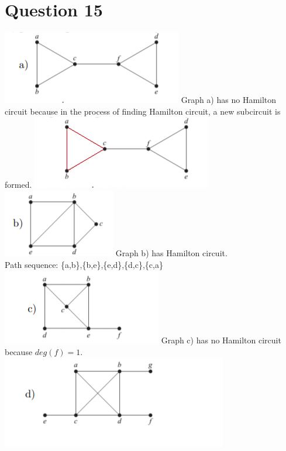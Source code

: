 \documentclass{article}
\begin{document}
\section*{Question 15}
\includegraphics[]{Question 15/connectivity_15.a.png}
\newline
Graph a) has no Hamilton circuit because in the process of finding Hamilton circuit, a new subcircuit is formed.
\newline
\includegraphics[]{Question 15/connectivity_15.a.edited.png}
\newline
\includegraphics[]{Question 15/connectivity_15.b.png}
\newline
Graph b) has Hamilton circuit.\\
Path sequence: \{a,b\},\{b,e\},\{e,d\},\{d,c\},\{c,a\}
\newline
\includegraphics[]{Question 15/connectivity_15.c.png}
\newline
Graph c) has no Hamilton circuit because $deg(f) = 1$.
\newline
\includegraphics[]{Question 15/connectivity_15.d.png}
\end{document}
